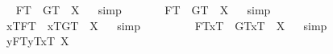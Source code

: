 \begin{isabellebody}
{}
%
\endisatagproof
{\isafoldproof}%
%
\isadelimproof
%
\endisadelimproof
\isanewline
\ \isamarkupfalse%
\ {\isachardoublequoteopen}F{}\isactrlsup T\ \isactrlbold {\isacharequal}\ G{}\isactrlsup T\ {\isacharequal}\ X{\isachardoublequoteclose}%
\isadelimproof
\ %
\endisadelimproof
%
\isatagproof
{}\isamarkupfalse%
\ simp\ \isamarkupfalse%
\ %
%
\endisatagproof
{\isafoldproof}%
%
\isadelimproof
%
\endisadelimproof
\ \isanewline
\ \isamarkupfalse%
\ {\isachardoublequoteopen}F{}\isactrlsup T\ \isactrlbold {\isacharequal}\ G{}\isactrlsup T\ {\isacharequal}\ X{\isachardoublequoteclose}%
\isadelimproof
\ %
\endisadelimproof
%
\isatagproof
{}\isamarkupfalse%
\ simp\ \isamarkupfalse%
\ %
%
\endisatagproof
{\isafoldproof}%
%
\isadelimproof
%
\endisadelimproof
\ \ \ \isanewline
\ \isamarkupfalse%
\ {\isachardoublequoteopen}{\isasymlbrace}x\isactrlsup T{\isacharcomma}F{}\isactrlsup T{\isasymrbrace}\ \isactrlbold {\isasymequiv}\ {\isasymlbrace}x\isactrlsup T{\isacharcomma}G{}\isactrlsup T{\isasymrbrace}\ {\isacharequal}\ X{\isachardoublequoteclose}%
\isadelimproof
\ %
\endisadelimproof
%
\isatagproof
{}\isamarkupfalse%
\ simp\ \isamarkupfalse%
\ %
%
\endisatagproof
{\isafoldproof}%
%
\isadelimproof
%
\endisadelimproof
\ \ \ \isanewline
\ \isamarkupfalse%
\ {\isachardoublequoteopen}{\isasymlparr}F{}\isactrlsup T{\isacharcomma}x\isactrlsup T{\isasymrparr}\ \isactrlbold {\isasymequiv}\ {\isasymlparr}G{}\isactrlsup T{\isacharcomma}x\isactrlsup T{\isasymrparr}\ {\isacharequal}\ X{\isachardoublequoteclose}%
\isadelimproof
\ %
\endisadelimproof
%
\isatagproof
{}\isamarkupfalse%
\ simp\ \isamarkupfalse%
\ %
%
\endisatagproof
{\isafoldproof}%
%
\isadelimproof
%
\endisadelimproof
\ \ \ \isanewline
\ \isamarkupfalse%
\ {\isachardoublequoteopen}{\isacharparenleft}\isactrlbold {\isasymlambda}y{\isachardot}{\isasymlparr}F{}\isactrlsup T{\isacharcomma}y\isactrlsup T{\isacharcomma}x{}\isactrlsup T{\isasymrparr}{\isacharparenright}{\isacharequal}\ X{\isachardoublequoteclose}%

\end{isabellebody}
